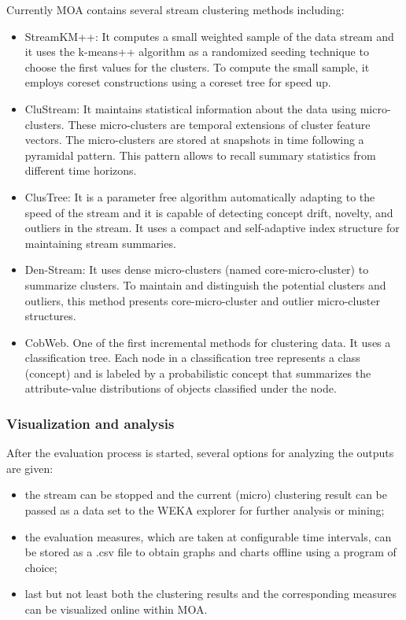 \documentclass[a4paper,12pt,twoside]{book}
\begin{document}
Currently MOA contains several stream clustering methods including:

\begin{itemize}
	\item StreamKM++: It computes a small weighted sample of the data stream
	 and it uses the k-means++ algorithm as a randomized seeding technique to choose the 
	 first values for the clusters. To compute the small sample, it employs coreset constructions
	 using a coreset tree for speed up. 
	\item CluStream: It maintains statistical information about the data using micro-clusters. These micro-clusters are temporal extensions of cluster feature vectors. The 
	micro-clusters are stored at snapshots in time following a pyramidal pattern. This pattern 
	allows to recall summary statistics from different time horizons. 
	\item ClusTree: It is a parameter free algorithm automatically adapting to the speed of the stream and it is capable of detecting concept drift, novelty, and outliers in the stream. It uses a compact and self-adaptive index structure for maintaining stream summaries.
	\item Den-Stream: It uses dense micro-clusters (named core-micro-cluster) 
	to summarize clusters. To maintain and distinguish the potential clusters and outliers, 
	this method presents core-micro-cluster and outlier micro-cluster structures.
	  \item CobWeb. One of the first incremental methods for clustering data. 
	  It uses a classification tree. Each node in a classification tree represents a class (concept)
	   and is labeled by a probabilistic concept that summarizes the attribute-value distributions
	    of objects classified under the node. 
\end{itemize}



\subsubsection{Visualization and analysis}
\label{sec:gui}

After the evaluation process is started, several options for analyzing the outputs are given:
\begin{itemize}
\item the stream can be stopped and the current (micro) clustering result can be passed as a data set to the WEKA explorer for further analysis or mining; 
\item the evaluation measures, which are taken at configurable time intervals, can be stored as a {.csv} file to obtain graphs and charts offline using a program of choice;
\item last but not least both the clustering results and the corresponding measures can be visualized online within MOA.\end{itemize}
\end{document}
